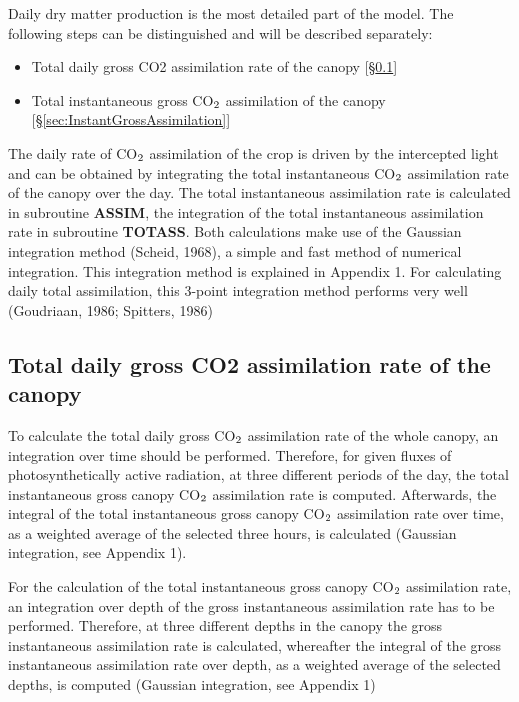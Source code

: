Daily dry matter production is the most detailed part of the model. The following steps
can be distinguished and will be described separately:
\begin{itemize}
\item Total daily gross CO2 assimilation rate of the canopy 
    [\S \ref{sec:DailyGrossAssimilation}]
\item Total instantaneous gross CO$_{{\rm 2}}$ assimilation of the canopy 
    [\S \ref{sec:InstantGrossAssimilation}]
\end{itemize}
 
The daily rate of CO$_{{\rm 2}}$ assimilation of the crop is driven by the intercepted light and can
be obtained by integrating the total instantaneous CO$_{{\rm 2}}$ assimilation rate of the canopy over
the day. The total instantaneous assimilation rate is calculated in subroutine {\bf ASSIM}, the
integration of the total instantaneous assimilation rate in subroutine {\bf TOTASS}. Both
calculations make use of the Gaussian integration method (Scheid, 1968), a simple and
fast method of numerical integration. This integration method is explained in Appendix 1.
For calculating daily total assimilation, this 3-point integration method performs very well
(Goudriaan, 1986; Spitters, 1986)

\subsection{Total daily gross CO2 assimilation rate of the canopy}
\label{sec:DailyGrossAssimilation}

To calculate the total daily gross CO$_{{\rm 2}}$ assimilation rate of the whole canopy, an integration over time should be performed. Therefore, for given fluxes of photosynthetically
active radiation, at three different periods of the day, the total instantaneous gross canopy
CO$_{{\rm 2}}$ assimilation rate is computed. Afterwards, the integral of the total instantaneous
gross canopy CO$_{{\rm 2}}$ assimilation rate over time, as a weighted average of the selected three
hours, is calculated (Gaussian integration, see Appendix 1).

For the calculation of the total instantaneous gross canopy CO$_{{\rm 2}}$ assimilation rate, an
integration over depth of the gross instantaneous assimilation rate has to be performed.
Therefore, at three different depths in the canopy the gross instantaneous assimilation rate
is calculated, whereafter the integral of the gross instantaneous assimilation rate over
depth, as a weighted average of the selected depths, is computed (Gaussian integration,
see Appendix 1)

